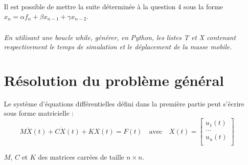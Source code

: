 \documentclass[10pt]{article}
\newif\ifprof
\begin{document}
Il est possible de mettre la suite déterminée à la question 4 sous la forme $x_n = \alpha f_n +\beta x_{n-1} + \gamma x_{n-2}$.

\subparagraph{}
\textit{En utilisant une boucle \textsf{while}, générer, en Python, les listes \textsf{T} et \textsf{X} contenant respectivement le temps de simulation et le déplacement de la masse mobile.}
\ifprof
\begin{corrige}
\begin{python}

T=[0,h]
X=[0,0]
t=2*h
i=2
while t<Tsimu:
    T.append(t)
    X.append(alpha*F[i]+beta*X[i-1] +gamma*X(i-2))
    i=i+1
    t = t+h
\end{python}
\end{corrige}
\else
\fi


\section{Résolution du problème général}
Le système d'équations différentielles défini dans la première partie peut s'écrire sous forme matricielle :
$$
M \ddot{X}(t) +C \dot{X}(t) +K {X}(t) = F(t) \quad \text{avec} \quad 
X(t)=\left[
\begin{array}{c} 
u_1(t) \\ 
... \\ 
u_n(t) \\
\end{array}\right]
$$

$M$, $C$ et $K$ des matrices carrées de taille $n\times n$.
\end{document}
